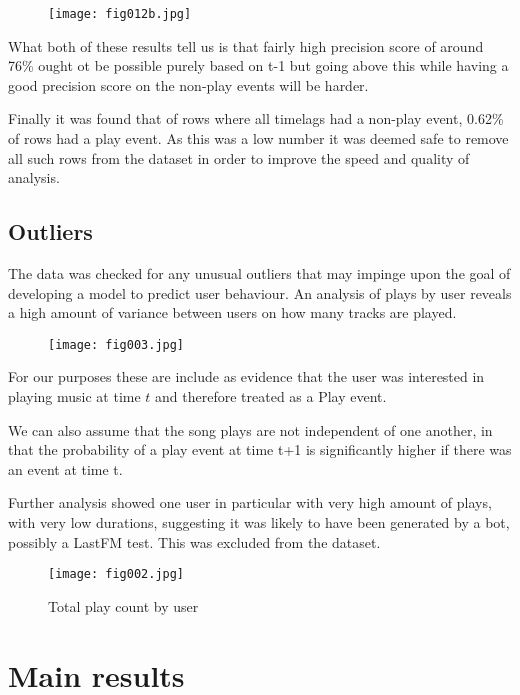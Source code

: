 \begin{figure}[h!]
	\centering
	\texttt{[image: fig012b.jpg]}
	\caption{}
	\label{fig12b}
\end{figure} 

What both of these results tell us is that fairly high precision score of around 76\% ought ot be possible purely based on t-1 but going above this while having a good precision score on the non-play events will be harder.

Finally it was found that of rows where all timelags had a non-play event, 0.62\% of rows had a play event. As this was a low number it was deemed safe to remove all such rows from the dataset in order to improve the speed and quality of analysis. 

\subsection{Outliers}

The data was checked for any unusual outliers that may impinge upon the goal of developing a model to predict user behaviour. An analysis of plays by user reveals a high amount of variance between users on how many tracks are played. 

\begin{figure}[h!]
	\centering
	\texttt{[image: fig003.jpg]}
	\caption{}
	\label{3d}
\end{figure} 

For our purposes these are include as evidence that the user was interested in playing music at time $t$ and therefore treated as a Play event.

We can also assume that the song plays are not independent of one another, in that the probability of a play event at time t+1 is significantly higher if there was an event at time t. 

\newpage

Further analysis showed one user in particular with very high amount of plays, with very low durations, suggesting it was likely to have been generated by a bot, possibly a LastFM test. This was excluded from the dataset.

\begin{figure}[h!]
	\centering
	\texttt{[image: fig002.jpg]}
	\caption{Total play count by user}
	\label{fig2}
\end{figure} 


\section{Main results} %

